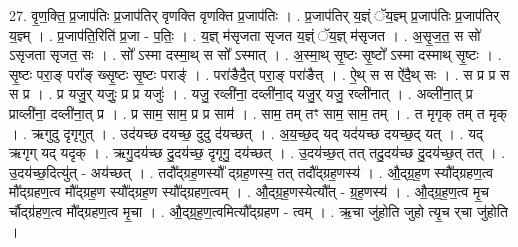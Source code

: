 \documentclass[17pt]{extarticle}
\begin{document}
27. वृ॒ण॒क्ति॒ प्र॒जाप॑तिः प्र॒जाप॑तिर् वृणक्ति वृणक्ति प्र॒जाप॑तिः । . प्र॒जाप॑तिर् य॒ज्ञ्ं ॅय॒ज्ञ्म् प्र॒जाप॑तिः प्र॒जाप॑तिर् य॒ज्ञ्म् । . प्र॒जाप॑ति॒रिति॑ प्र॒जा - प॒तिः॒ । . य॒ज्ञ् म॑सृजता सृजत य॒ज्ञ्ं ॅय॒ज्ञ् म॑सृजत । . अ॒सृ॒ज॒त॒ स सो॑ ऽसृजता सृजत॒ सः । . सो᳚ ऽस्मा दस्मा॒थ् स सो᳚ ऽस्मात् । . अ॒स्मा॒थ् सृ॒ष्टः सृ॒ष्टो᳚ ऽस्मा दस्माथ् सृ॒ष्टः । . सृ॒ष्टः परा॒ङ् परा᳚ङ् ख्सृ॒ष्टः सृ॒ष्टः पराङ्॑ । . परा॑ङैदै॒त् परा॒ङ् परा॑ङैत् । . ऐ॒थ् स स ऐ॑दै॒थ् सः । . स प्र प्र स स प्र । . प्र यजु॒र् यजुः॒ प्र प्र यजुः॑ । . यजु॒ रव्ली॑ना॒ दव्ली॑ना॒द् यजु॒र् यजु॒ रव्ली॑नात् । . अव्ली॑ना॒त् प्र प्राव्ली॑ना॒ दव्ली॑ना॒त् प्र । . प्र साम॒ साम॒ प्र प्र साम॑ । . साम॒ तम् तꣳ साम॒ साम॒ तम् । . त मृगृक् तम् त मृक् । . ऋगुदु दृगृगुत् । . उद॑यच्छ दयच्छ॒ दुदु द॑यच्छत् । . अ॒य॒च्छ॒द् यद् यद॑यच्छ दयच्छ॒द् यत् । . यद् ऋगृग् यद् यदृक् । . ऋगु॒दय॑च्छ दु॒दय॑च्छ॒ दृगृगु॒ दय॑च्छत् । . उ॒दय॑च्छ॒त् तत् तदु॒दय॑च्छ दु॒दय॑च्छ॒त् तत् । . उ॒दय॑च्छ॒दित्यु॑त् - अय॑च्छत् । . तदौ᳚द्ग्रह॒णस्यौ᳚ द्ग्रह॒णस्य॒ तत् तदौ᳚द्ग्रह॒णस्य॑ । . औ॒द्ग्र॒ह॒ण स्यौ᳚द्ग्रहण॒त्व मौ᳚द्ग्रहण॒त्व मौ᳚द्ग्रह॒ण स्यौ᳚द्ग्रह॒ण स्यौ᳚द्ग्रहण॒त्वम् । . औ॒द्ग्र॒ह॒णस्येत्यौ᳚त् - ग्र॒ह॒णस्य॑ । . औ॒द्ग्र॒ह॒ण॒त्व मृ॒च र्चौद्ग्र॑हण॒त्व मौ᳚द्ग्रहण॒त्व मृ॒चा । . औ॒द्ग्र॒ह॒ण॒त्वमित्यौ᳚द्ग्रहण - त्वम् । . ऋ॒चा जु॑होति जुहो त्यृ॒च र्‌चा जु॑होति । \newline
\end{document}
